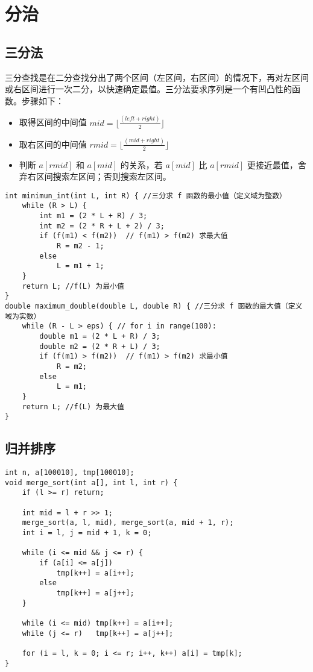 \section{分治}
\subsection{三分法}
\noindent \par 三分查找是在二分查找分出了两个区间（左区间，右区间）的情况下，再对左区间或右区间进行一次二分，以快速确定最值。三分法要求序列是一个有凹凸性的函数。步骤如下：

\begin{itemize}
    \item 取得区间的中间值 $mid = \lfloor \frac{(left + right)}{2} \rfloor$
    \item 取右区间的中间值 $rmid = \lfloor \frac{(mid + right)}{2} \rfloor$
    \item 判断 $a[rmid]$ 和 $a[mid]$ 的关系，若 $a[mid]$ 比 $a[rmid]$ 更接近最值，舍弃右区间搜索左区间；否则搜索左区间。
\end{itemize}

\begin{verbatim}
int minimun_int(int L, int R) { //三分求 f 函数的最小值（定义域为整数）
    while (R > L) {
        int m1 = (2 * L + R) / 3;
        int m2 = (2 * R + L + 2) / 3;
        if (f(m1) < f(m2))  // f(m1) > f(m2) 求最大值
            R = m2 - 1;
        else
            L = m1 + 1;
    }
    return L; //f(L) 为最小值
}
double maximum_double(double L, double R) { //三分求 f 函数的最大值（定义域为实数）
    while (R - L > eps) { // for i in range(100):
        double m1 = (2 * L + R) / 3;
        double m2 = (2 * R + L) / 3;
        if (f(m1) > f(m2))  // f(m1) > f(m2) 求最小值
            R = m2;
        else
            L = m1;
    }
    return L; //f(L) 为最大值
}
\end{verbatim}

\subsection{归并排序}
\begin{verbatim}
int n, a[100010], tmp[100010];
void merge_sort(int a[], int l, int r) {
    if (l >= r) return;

    int mid = l + r >> 1;
    merge_sort(a, l, mid), merge_sort(a, mid + 1, r);
    int i = l, j = mid + 1, k = 0;

    while (i <= mid && j <= r) {
        if (a[i] <= a[j])
            tmp[k++] = a[i++];
        else
            tmp[k++] = a[j++];
    }

    while (i <= mid) tmp[k++] = a[i++];
    while (j <= r)   tmp[k++] = a[j++];

    for (i = l, k = 0; i <= r; i++, k++) a[i] = tmp[k];
}
\end{verbatim}

